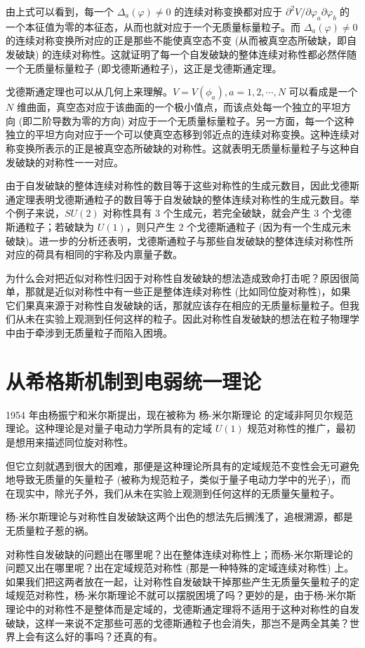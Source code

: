 \documentclass[oneside,a4paper,openany,11pt]{ctexbook}
\begin{document}
\noindent 由上式可以看到，每一个 $\Delta_a(\varphi) \ne 0$ 的连续对称变换都对应于 $\partial^2 V/\partial \varphi_a \partial \varphi_b$ 的一个本征值为零的本征态，从而也就对应于一个无质量标量粒子。而 $\Delta_a(\varphi) \ne 0$ 的连续对称变换所对应的正是那些不能使真空态不变 (从而被真空态所破缺，即自发破缺) 的连续对称性。这就证明了每一个自发破缺的整体连续对称性都必然伴随一个无质量标量粒子 (即戈德斯通粒子)，这正是戈德斯通定理。

戈德斯通定理也可以从几何上来理解。$V=V(\phi_a), a=1, 2, \cdots, N$ 可以看成是一个 $N$ 维曲面，真空态对应于该曲面的一个极小值点，而该点处每一个独立的平坦方向 (即二阶导数为零的方向) 对应于一个无质量标量粒子。另一方面，每一个这种独立的平坦方向对应于一个可以使真空态移到邻近点的连续对称变换。这种连续对称变换所表示的正是被真空态所破缺的对称性。这就表明无质量标量粒子与这种自发破缺的对称性一一对应。

由于自发破缺的整体连续对称性的数目等于这些对称性的生成元数目，因此戈德斯通定理表明戈德斯通粒子的数目等于自发破缺的整体连续对称性的生成元数目。举个例子来说，$SU(2)$ 对称性具有 $3$ 个生成元，若完全破缺，就会产生 $3$ 个戈德斯通粒子；若破缺为 $U(1)$，则只产生 $2$ 个戈德斯通粒子 (因为有一个生成元未破缺)。进一步的分析还表明，戈德斯通粒子与那些自发破缺的整体连续对称性所对应的荷具有相同的宇称及内禀量子数。

为什么会对把近似对称性归因于对称性自发破缺的想法造成致命打击呢？原因很简单，那就是近似对称性中有一些正是整体连续对称性 (比如同位旋对称性)，如果它们果真来源于对称性自发破缺的话，那就应该存在相应的无质量标量粒子。但我们从未在实验上观测到任何这样的粒子。因此对称性自发破缺的想法在粒子物理学中由于牵涉到无质量粒子而陷入困境。

\section{从希格斯机制到电弱统一理论}

1954 年由杨振宁和米尔斯提出，现在被称为 杨-米尔斯理论 的定域非阿贝尔规范理论。这种理论是对量子电动力学所具有的定域 $U(1)$ 规范对称性的推广，最初是想用来描述同位旋对称性。

但它立刻就遇到很大的困难，那便是这种理论所具有的定域规范不变性会无可避免地导致无质量的矢量粒子 (被称为规范粒子，类似于量子电动力学中的光子)，而在现实中，除光子外，我们从未在实验上观测到任何这样的无质量矢量粒子。

杨-米尔斯理论与对称性自发破缺这两个出色的想法先后搁浅了，追根溯源，都是无质量粒子惹的祸。

对称性自发破缺的问题出在哪里呢？出在整体连续对称性上；而杨-米尔斯理论的问题又出在哪里呢？出在定域规范对称性 (那是一种特殊的定域连续对称性) 上。如果我们把这两者放在一起，让对称性自发破缺干掉那些产生无质量矢量粒子的定域规范对称性，杨-米尔斯理论不就可以摆脱困境了吗？更妙的是，由于杨-米尔斯理论中的对称性不是整体而是定域的，戈德斯通定理将不适用于这种对称性的自发破缺，这样一来说不定那些可恶的戈德斯通粒子也会消失，那岂不是两全其美？世界上会有这么好的事吗？还真的有。
\end{document}
